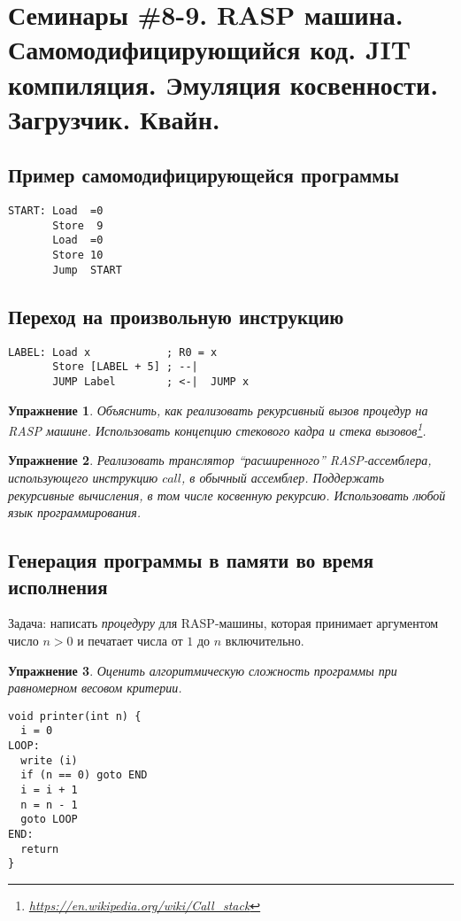 \documentclass[a4paper, 12pt]{extarticle}
\newtheorem*{homework}{Упражнение}
\begin{document}
\newpage
\section*{Семинары \#8-9. RASP машина. Самомодифицирующийся код. JIT компиляция. Эмуляция косвенности. Загрузчик. Квайн. }

\subsection*{Пример самомодифицирующейся программы}
\begin{verbatim}
START: Load  =0
       Store  9
       Load  =0
       Store 10
       Jump  START
\end{verbatim}

\subsection*{Переход на произвольную инструкцию}
\begin{verbatim}
LABEL: Load x            ; R0 = x
       Store [LABEL + 5] ; --|
       JUMP Label        ; <-|  JUMP x
\end{verbatim}

\begin{homework}
  Объяснить, как реализовать рекурсивный вызов процедур на RASP машине.
  Использовать концепцию стекового кадра и стека вызовов\footnote{\url{https://en.wikipedia.org/wiki/Call_stack}}.
\end{homework}

\begin{homework}
 Реализовать транслятор ``расширенного'' RASP-ассемблера, использующего инструкцию $call$, в обычный ассемблер.
 Поддержать рекурсивные вычисления, в том числе косвенную рекурсию. Использовать любой язык программирования. 
\end{homework}

\subsection*{Генерация программы в памяти во время исполнения}
Задача: написать \textit{процедуру} для RASP-машины, которая принимает аргументом число $n > 0$ и печатает числа от $1$ до $n$ включительно. 

\begin{homework}
Оценить алгоритмическую сложность программы при равномерном весовом критерии.
\begin{verbatim}
void printer(int n) {
  i = 0
LOOP: 
  write (i)
  if (n == 0) goto END
  i = i + 1
  n = n - 1
  goto LOOP
END: 
  return 
}   
\end{verbatim}
\end{homework}
\end{document}
